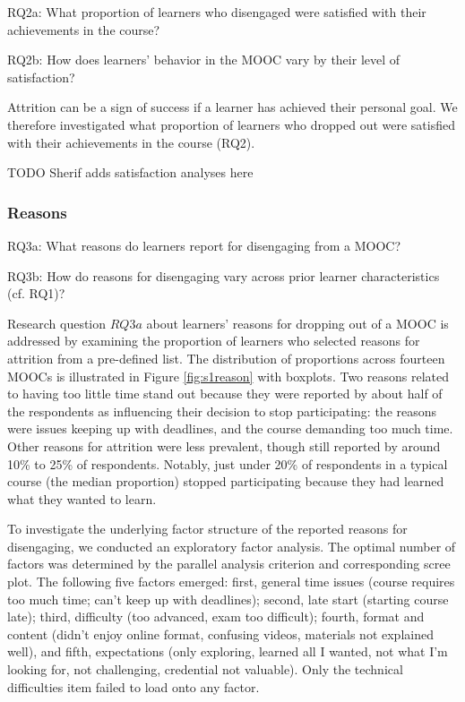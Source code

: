 \documentclass{sigchi}\usepackage[]{graphicx}\usepackage[]{color}
\begin{document}
RQ2a: What proportion of learners who disengaged were satisfied with their achievements in the course?

RQ2b: How does learners' behavior in the MOOC vary by their level of satisfaction?

Attrition can be a sign of success if a learner has achieved their personal goal. We therefore investigated what proportion of learners who dropped out were satisfied with their achievements in the course (RQ2). 

TODO Sherif adds satisfaction analyses here

\subsubsection{Reasons}

RQ3a: What reasons do learners report for disengaging from a MOOC?

RQ3b: How do reasons for disengaging vary across prior learner characteristics (cf. RQ1)?

Research question $RQ3a$ about learners' reasons for dropping out of a MOOC is addressed by examining the proportion of learners who selected reasons for attrition from a pre-defined list. The distribution of proportions across fourteen MOOCs is illustrated in Figure \ref{fig:s1reason} with boxplots. Two reasons related to having too little time stand out because they were reported by about half of the respondents as influencing their decision to stop participating: the reasons were issues keeping up with deadlines, and the course demanding too much time. Other reasons for attrition were less prevalent, though still reported by around 10\% to 25\% of respondents. Notably, just under 20\% of respondents in a typical course (the median proportion) stopped participating because they had learned what they wanted to learn.

To investigate the underlying factor structure of the reported reasons for disengaging, we conducted an exploratory factor analysis. The optimal number of factors was determined by the parallel analysis criterion and corresponding scree plot. The following five factors emerged: first, general time issues (course requires too much time; can't keep up with deadlines); second, late start (starting course late); third, difficulty (too advanced, exam too difficult); fourth, format and content (didn't enjoy online format, confusing videos, materials not explained well), and fifth, expectations (only exploring, learned all I wanted, not what I'm looking for, not challenging, credential not valuable). Only the technical difficulties item failed to load onto any factor.
\end{document}
